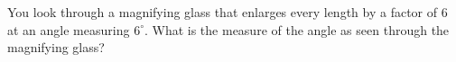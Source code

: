 You look through a magnifying glass that enlarges every length by a factor of $6$ at an angle measuring $6^\circ$. What is the measure of the angle as seen through the magnifying glass?
